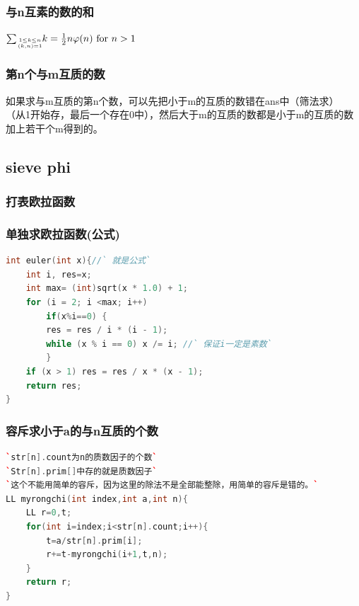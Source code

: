 \documentclass[a4paper]{article}
\begin{document}
\begin{CJK*}{UTF8}{gbsn}
\begin{multicols}{3}
\begin{flushleft}



\subsubsection{与n互素的数的和}
$\sum_{1\le k\le n \atop (k,n)=1}\!\!k = \frac{1}{2}n\varphi(n)\text{ for }n>1$


\subsubsection{第n个与m互质的数}
如果求与m互质的第n个数，可以先把小于m的互质的数错在ans中（筛法求）
（从1开始存，最后一个存在0中），然后大于m的互质的数都是小于m的互质的数加上若干个m得到的。



\subsection{sieve phi}


\subsubsection{打表欧拉函数}



\subsubsection{单独求欧拉函数(公式)}
\begin{lstlisting}[language={c++}]
int euler(int x){//` 就是公式`
	int i, res=x;
	int max= (int)sqrt(x * 1.0) + 1; 
	for (i = 2; i <max; i++)
		if(x%i==0) {
		res = res / i * (i - 1);
		while (x % i == 0) x /= i; //` 保证i一定是素数`
		}
	if (x > 1) res = res / x * (x - 1);
	return res;
}
\end{lstlisting}


\subsubsection{容斥求小于a的与n互质的个数}
\begin{lstlisting}[language={c++}]
`str[n].count为n的质数因子的个数`
`Str[n].prim[]中存的就是质数因子`
`这个不能用简单的容斥，因为这里的除法不是全部能整除，用简单的容斥是错的。`
LL myrongchi(int index,int a,int n){
	LL r=0,t;
	for(int i=index;i<str[n].count;i++){
		t=a/str[n].prim[i];
		r+=t-myrongchi(i+1,t,n);
	}
	return r;	
}
\end{lstlisting}


\end{flushleft}
\end{multicols}
\end{CJK*}
\end{document}
